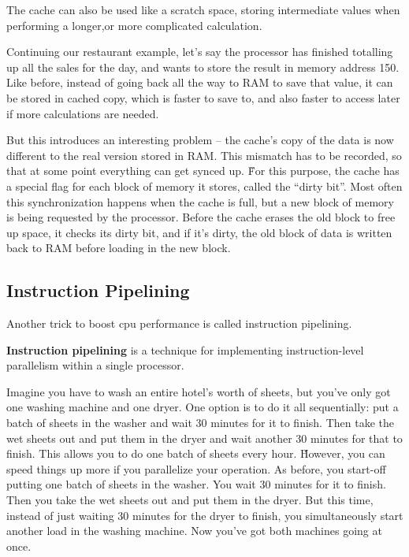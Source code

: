 The cache can also be used like a scratch space, storing intermediate values when performing a longer,or more
complicated calculation.

\be
Continuing our restaurant example, let's say the processor has finished totalling up all the sales for the day,
and wants to store the result in memory address 150. Like before, instead of going back all the way to RAM to save
that value, it can be stored in cached copy, which is faster to save to, and also faster to access later if more
calculations are needed.
\ee

But this introduces an interesting problem -- the cache's copy of the data is now different to the real version
stored in RAM. This mismatch has to be recorded, so that at some point everything can get synced up. \v

For this purpose, the cache has a special flag for each block of memory it stores, called the ``dirty bit''. Most
often this synchronization happens when the cache is full, but a new block of memory is being requested by the
processor. Before the cache erases the old block to free up space, it checks its dirty bit, and if it's dirty, the
old block of data is written back to RAM before loading in the new block.

\subsection{Instruction Pipelining}

Another trick to boost cpu performance is called instruction pipelining.

\textbf{Instruction pipelining} is a technique for implementing instruction-level parallelism within a single processor.
\ed

\be
Imagine you have to wash an entire hotel's worth of sheets, but you've only got one washing machine and one dryer.
One option is to do it all sequentially: put a batch of sheets in the washer and wait 30 minutes for it to finish.
Then take the wet sheets out and put them in the dryer and wait another 30 minutes for that to finish. This allows
you to do one batch of sheets every hour. \v

However, you can speed things up more if you parallelize your operation. As before, you start-off putting one batch of
sheets in the washer. You wait 30 minutes for it to finish. Then you take the wet sheets out and put them in the
dryer. But this time, instead of just waiting 30 minutes for the dryer to finish, you simultaneously start another
load in the washing machine. Now you've got both machines going at once.
\ee

